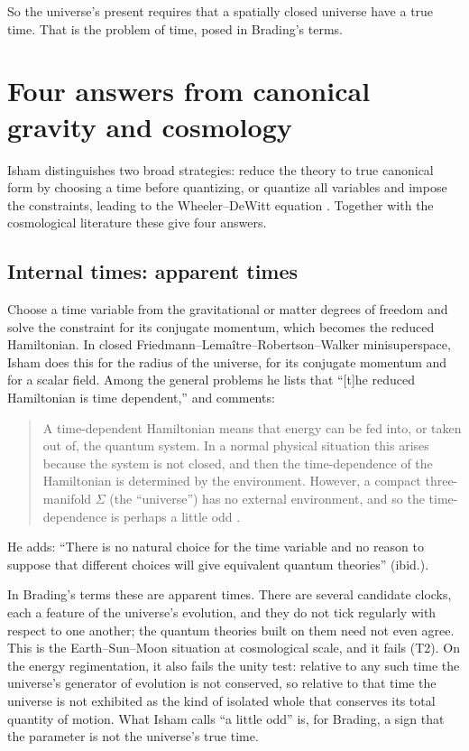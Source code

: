 \documentclass[11pt]{article}
\begin{document}
So the universe's present requires that a spatially closed universe have a
true time. That is the problem of time, posed in Brading's terms.

\section{Four answers from canonical gravity and cosmology}\label{sec:routes}

Isham distinguishes two broad strategies: reduce the theory to true canonical
form by choosing a time before quantizing, or quantize all variables and impose
the constraints, leading to the Wheeler--DeWitt equation
\citep[pp.~196--198]{Isham1991}. Together with the cosmological literature these
give four answers.

\subsection{Internal times: apparent times}\label{sec:internal}

Choose a time variable from the gravitational or matter degrees of freedom and
solve the constraint for its conjugate momentum, which becomes the reduced
Hamiltonian. In closed Friedmann--Lemaître--Robertson--Walker minisuperspace,
Isham does this for the radius of the universe, for its conjugate momentum and
for a scalar field. Among the general problems he lists that ``[t]he reduced
Hamiltonian is time dependent,'' and comments:

\begin{quote}
A time-dependent Hamiltonian means that energy can be fed into, or taken out
of, the quantum system. In a normal physical situation this arises because the
system is not closed, and then the time-dependence of the Hamiltonian is
determined by the environment. However, a compact three-manifold $\Sigma$ (the
``universe'') has no external environment, and so the time-dependence is
perhaps a little odd \citep[p.~200]{Isham1991}.
\end{quote}

He adds: ``There is no natural choice for the time variable and no reason to
suppose that different choices will give equivalent quantum theories'' (ibid.).

In Brading's terms these are apparent times. There are several candidate clocks,
each a feature of the universe's evolution, and they do not tick regularly with
respect to one another; the quantum theories built on them need not even agree.
This is the Earth--Sun--Moon situation at cosmological scale, and it fails (T2).
On the energy regimentation, it also fails the unity test: relative to any such
time the universe's generator of evolution is not conserved, so relative to that
time the universe is not exhibited as the kind of isolated whole that conserves
its total quantity of motion. What Isham calls ``a little odd'' is, for Brading,
a sign that the parameter is not the universe's true time.
\end{document}
